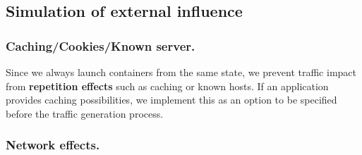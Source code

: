 \documentclass[runningheads]{llncs}
\begin{document}





\subsection{Simulation of external influence}\label{Sec:ExtInfls}

\subsubsection*{Caching/Cookies/Known server.}

Since we always launch containers from the same state, we prevent traffic impact from \textbf{repetition effects} such as caching or known hosts. If an application provides caching possibilities, we implement this as an option to be specified before the traffic generation process.


\subsubsection*{Network effects.}

\end{document}
